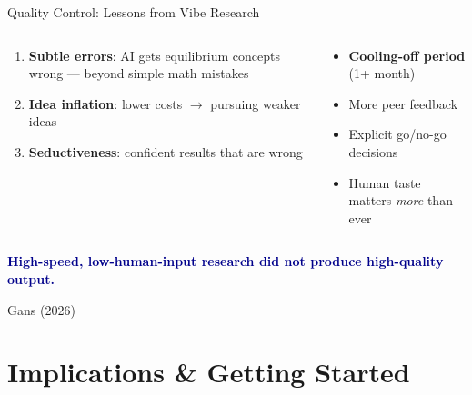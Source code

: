 \documentclass[aspectratio=169, 11pt]{beamer}
\newcommand{\emphgold}[1]{\alert{\textbf{#1}}}
\newcommand{\sourceref}[1]{\vspace{0.15cm}\hfill{\tiny\textcolor{medgray}{#1}}}
\begin{document}
\begin{frame}{Quality Control: Lessons from Vibe Research}
\begin{columns}[T]
\begin{warningbox}
\begin{enumerate}
  \item \textbf{Subtle errors}: AI gets equilibrium concepts wrong --- beyond simple math mistakes
  \item \textbf{Idea inflation}: lower costs $\rightarrow$ pursuing weaker ideas
  \item \textbf{Seductiveness}: confident results that are wrong
\end{enumerate}
\end{warningbox}

\begin{keyinsight}[Guardrails]
\begin{itemize}
  \item \emphgold{Cooling-off period} (1+ month)
  \item More peer feedback
  \item Explicit go/no-go decisions
  \item Human taste matters \emph{more} than ever
\end{itemize}
\end{keyinsight}
\end{columns}
\vspace{0.2cm}
\begin{center}
\small\textcolor{darkblue}{\textbf{High-speed, low-human-input research did not produce high-quality output.}}
\end{center}
\sourceref{Gans (2026)}
\end{frame}


\section{Implications \& Getting Started}
\end{document}
